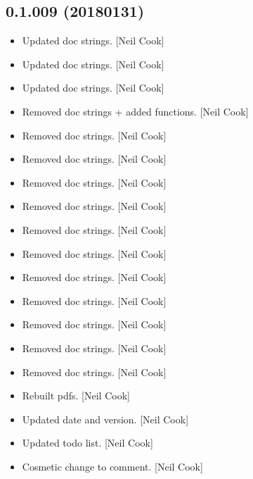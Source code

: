 \documentclass[a4paper,10pt,english]{report}
\begin{document}
\subsection{0.1.009 (2018\sphinxhyphen{}01\sphinxhyphen{}31)}
\label{\detokenize{misc/changelog:id514}}\begin{itemize}
\item {} 
Updated doc strings. {[}Neil Cook{]}

\item {} 
Updated doc strings. {[}Neil Cook{]}

\item {} 
Updated doc strings. {[}Neil Cook{]}

\item {} 
Removed doc strings + added  functions. {[}Neil Cook{]}

\item {} 
Removed doc strings. {[}Neil Cook{]}

\item {} 
Removed doc strings. {[}Neil Cook{]}

\item {} 
Removed doc strings. {[}Neil Cook{]}

\item {} 
Removed doc strings. {[}Neil Cook{]}

\item {} 
Removed doc strings. {[}Neil Cook{]}

\item {} 
Removed doc strings. {[}Neil Cook{]}

\item {} 
Removed doc strings. {[}Neil Cook{]}

\item {} 
Removed doc strings. {[}Neil Cook{]}

\item {} 
Removed doc strings. {[}Neil Cook{]}

\item {} 
Removed doc strings. {[}Neil Cook{]}

\item {} 
Removed doc strings. {[}Neil Cook{]}

\item {} 
Rebuilt pdfs. {[}Neil Cook{]}

\item {} 
Updated date and version. {[}Neil Cook{]}

\item {} 
Updated todo list. {[}Neil Cook{]}

\item {} 
Cosmetic change to comment. {[}Neil Cook{]}

\end{itemize}
\end{document}
